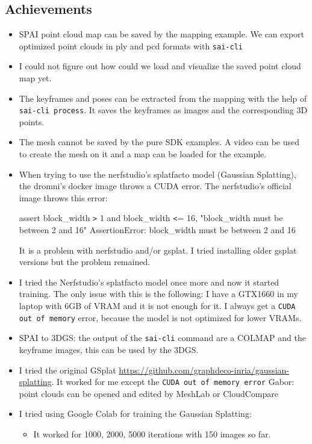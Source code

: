 \documentclass{article}
\begin{document}
\subsection{Achievements}
\begin{itemize}
    \item SPAI point cloud map can be saved by the mapping example. We can export optimized point clouds in ply and pcd formats with \verb|sai-cli|
    \item I could not figure out how could we load and visualize the saved point cloud map yet.
    \item The keyframes and poses can be extracted from the mapping with the help of \verb|sai-cli process|. It saves the keyframes as images and the corresponding 3D points.
    \item The mesh cannot be saved by the pure SDK examples. A video can be used to create the mesh on it and a map can be loaded for the example.
    \item When trying to use the nerfstudio's splatfacto model (Gaussian Splatting), the dromni's docker image throws a CUDA error. The nerfstudio's official image throws this error:\par
    assert block\_width \verb|>| 1 and block\_width \verb|<|= 16, "block\_width must be between 2 and 16"
    AssertionError: block\_width must be between 2 and 16\par
    It is a problem with nerfstudio and/or gsplat. I tried installing older gsplat versions but the problem remained.
    \item I tried the Nerfstudio's splatfacto model once more and now it started training. The only issue with this is the following: I have a GTX1660 in my laptop with 6GB of VRAM and it is not enough for it. I always get a \verb|CUDA out of memory| error, because the model is not optimized for lower VRAMs.
    \item SPAI to 3DGS: the output of the \verb|sai-cli| command are a COLMAP and the keyframe images, this can be used by the 3DGS.
    \item I tried the original GSplat \url{https://github.com/graphdeco-inria/gaussian-splatting}. It worked for me except the \verb|CUDA out of memory error| Gabor: point clouds can be opened and edited by MeshLab or CloudCompare
    \item I tried using Google Colab for training the Gaussian Splatting:
    \begin{itemize}
        \item It worked for 1000, 2000, 5000 iterations with 150 images so far.

\end{itemize}
\end{itemize}
\end{document}
